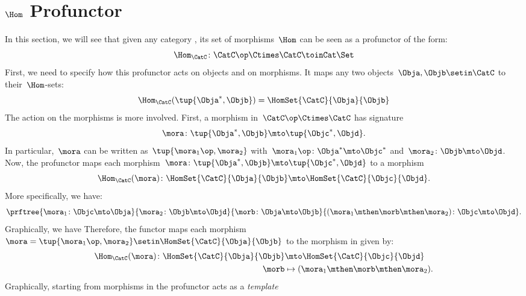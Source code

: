 
\section{$\Hom$ Profunctor}

In this section, we will see that given any category \CatC, its set of morphisms~$\Hom$ can be seen as a profunctor of the form:
\begin{equation}
    \label{eq:hom-signature}
    \Hom_\CatC\colon \CatC \op \Ctimes \CatC \toinCat \Set
\end{equation}
First, we need to specify how this profunctor acts on objects and on morphisms.
It maps any two objects~$\Obja,\Objb\setin \CatC$ to their~$\Hom$-sets:
\begin{equation}
    \label{eq:hom-action}
    \Hom_\CatC(\tup{\Obja^*,\Objb})=\HomSet{\CatC}{\Obja}{\Objb}
\end{equation}
The action on the morphisms is more involved.
First, a morphism in~$\CatC\op \Ctimes \CatC$ has signature
%
\begin{equation}
    \label{eq:hom0}
    \mora \colon \tup{\Obja^*,\Objb}\mto \tup{\Objc^*, \Objd}.
\end{equation}
%
In particular,~$\mora$ can be written as~$\tup{\mora_1\op,\mora_2}$ with~$\mora_1\op\colon \Obja^*\mto \Objc^*$ and~$\mora_2\colon \Objb\mto \Objd$.
Now, the profunctor maps each morphism~$\mora \colon \tup{\Obja^*,\Objb}\mto \tup{\Objc^*, \Objd}$ to a morphism
%
\begin{equation}
    \label{eq:hom2}
    \Hom_\CatC(\mora)\colon \HomSet{\CatC}{\Obja}{\Objb}\mto \HomSet{\CatC}{\Objc}{\Objd}.
\end{equation}
%
More specifically, we have:
%
\begin{equation}
    \label{eq:hom3}
    \prftree{
        \mora_1\colon \Objc \mto \Obja
    }{
        \mora_2\colon \Objb\mto \Objd
    }{
        \morb\colon \Obja\mto \Objb
    }{
        (\mora_1\mthen \morb \mthen \mora_2)\colon \Objc\mto \Objd
    }.
\end{equation}
%
Graphically, we have
%
Therefore, the functor maps each morphism~$\mora=\tup{\mora_1\op,\mora_2}\setin \HomSet{\CatC}{\Obja}{\Objb}$ to the morphism in \Set given by:
%
\begin{equation}
    \label{eq:hom4}
    \begin{aligned}
        \Hom_\CatC(\mora)\colon \HomSet{\CatC}{\Obja}{\Objb} & \mto \HomSet{\CatC}{\Objc}{\Objd} \\
        \morb                                                & \mapsto (\mora_1\mthen \morb \mthen \mora_2).
    \end{aligned}
\end{equation}
%
Graphically, starting from morphisms in \CatC
%
%
the profunctor acts as a \emph{template}
%

